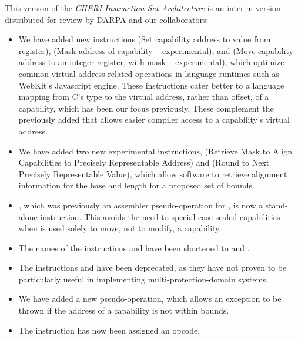 This version of the \textit{CHERI Instruction-Set Architecture} is an interim
version distributed for review by DARPA and our collaborators:

\begin{itemize}
\item We have added new instructions  (Set capability
  address to value from register),  (Mask address of
  capability -- experimental), and  (Move capability
  address to an integer register, with mask -- experimental), which optimize
  common virtual-address-related operations in language runtimes such as
  WebKit's Javascript engine.
  These instructions cater better to a language mapping from C's
   type to the virtual address, rather than offset, of a
  capability, which has been our focus previously.
  These complement the previously added  that allows
  easier compiler access to a capability's virtual address.

\item We have added two new experimental instructions, 
  (Retrieve Mask to Align Capabilities to Precisely Representable Address) and
   (Round to Next Precisely Representable Value), which
  allow software to retrieve alignment information for the base and length for
  a proposed set of bounds.

\item {}, which was previously an assembler pseudo-operation
  for , is now a stand-alone instruction.
  This avoids the need to special case sealed capabilities when
   is used solely to move, not to modify, a
  capability.

\item The names of the instructions  and
   have been shortened to
   and .

\item The instructions  and 
  have been deprecated, as they have not proven to be particularly useful in
  implementing multi-protection-domain systems.

\item We have added a new pseudo-operation,
   which allows an exception
  to be thrown if the address of a capability is not within bounds.

\item The instruction  has now been assigned an opcode.


\end{itemize}
